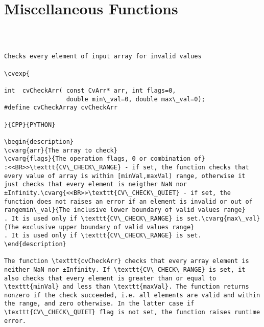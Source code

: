 \section{Miscellaneous Functions}
\begin{verbatim}


\end{verbatim}
\label{CheckArr}
\begin{verbatim}

Checks every element of input array for invalid values

\cvexp{

int  cvCheckArr( const CvArr* arr, int flags=0,
                 double min\_val=0, double max\_val=0);
#define cvCheckArray cvCheckArr

}{CPP}{PYTHON}

\begin{description}
\cvarg{arr}{The array to check}
\cvarg{flags}{The operation flags, 0 or combination of}
:<<BR>>\texttt{CV\_CHECK\_RANGE} - if set, the function checks that every value of array is within [minVal,maxVal) range, otherwise it just checks that every element is neigther NaN nor ±Infinity.\cvarg{<<BR>>\texttt{CV\_CHECK\_QUIET} - if set, the function does not raises an error if an element is invalid or out of rangemin\_val}{The inclusive lower boundary of valid values range}
. It is used only if \texttt{CV\_CHECK\_RANGE} is set.\cvarg{max\_val}{The exclusive upper boundary of valid values range}
. It is used only if \texttt{CV\_CHECK\_RANGE} is set.
\end{description}

The function \texttt{cvCheckArr} checks that every array element is neither NaN nor ±Infinity. If \texttt{CV\_CHECK\_RANGE} is set, it also checks that every element is greater than or equal to \texttt{minVal} and less than \texttt{maxVal}. The function returns nonzero if the check succeeded, i.e. all elements are valid and within the range, and zero otherwise. In the latter case if \texttt{CV\_CHECK\_QUIET} flag is not set, the function raises runtime error.


\end{verbatim}
\label{KMeans2}
